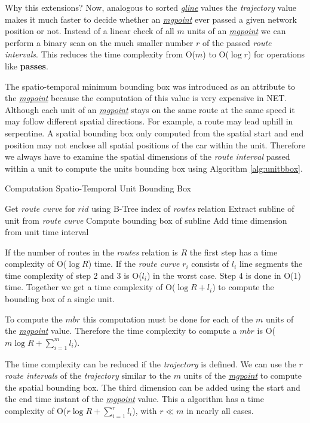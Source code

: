 \documentclass[a4paper]{article}
\newcommand{\op}[1]{\textbf{#1}}
\newcommand{\dt}[1]{\textsl{\underline{#1}}}
\begin{document}
Why this extensions?
Now, analogous to sorted \dt{gline} values the \textit{trajectory} value makes it much
faster to decide whether an \dt{mgpoint} ever passed a given network position or
not. Instead of a linear check of all $m$ units of an \dt{mgpoint} we can
perform
a binary scan on the much smaller number $r$ of the passed \textit{route
intervals}.
This reduces the time complexity from O($m$) to O($\log r$) for operations
like \op{passes}.

The spatio-temporal minimum bounding box was introduced as an attribute to the
\dt{mgpoint} because the computation of this value is very expensive in NET.
Although each unit of an \dt{mgpoint} stays on the same route
at the same speed it may follow different spatial directions. For example, a
route may lead uphill in serpentine. A spatial bounding box only computed from
the spatial start and end position may not enclose all spatial positions of the
car within the unit. Therefore we always have to examine the spatial dimensions
of the \textit{route interval} passed within a unit to compute the units
bounding box
using Algorithm \ref{alg:unitbbox}.
\begin{algorithm}[H]
  \caption{Computation Spatio-Temporal Unit Bounding Box}
  \label{alg:unitbbox}
  \begin{algorithmic}[1]
    \STATE Get \textit{route curve} for $rid$ using B-Tree index of \textit{routes}
relation
    \STATE Extract subline of unit from \textit{route curve}
    \STATE Compute bounding box of subline
    \STATE Add time dimension from unit time interval
  \end{algorithmic}
\end{algorithm}
If the number of routes in the \textit{routes} relation is $R$ the first step has a
time complexity of O($\log R$) time. If the \textit{route curve} $r_i$ consists
of $l_i$
line segments the time complexity of step 2 and 3 is O($l_i$) in the worst case.
Step 4 is done in O(1) time. Together we get a time complexity of
O($\log {R} + l_i$) to compute the bounding box of a single unit.

To compute the $mbr$ this computation must be done for each of the $m$ units of
the \dt{mgpoint} value. Therefore the time complexity to compute a $mbr$ is 
O($m \log {R} + \sum_{i=1}^{m}{l_i}$).

The time complexity can be reduced if the \textit{trajectory} is defined. We can use
the $r$ \textit{route intervals} of the \textit{trajectory} similar to the $m$ units of
the \dt{mgpoint} to compute the spatial bounding box. The third dimension can be
added using the start and the end time instant of the \dt{mgpoint} value. This a
algorithm has a time complexity of O($r \log {R} + \sum_{i=1}^{r}{l_i}$), with
$r \ll m$ in nearly all cases.
\end{document}
